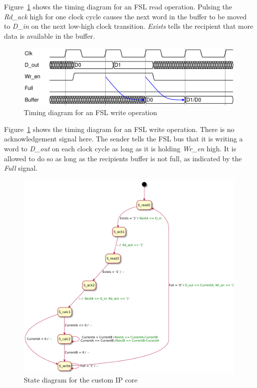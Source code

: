 \documentclass[11pt]{article}
\begin{document}
Figure~\ref{fig:fsl-write} shows the timing diagram for an FSL read operation. Pulsing the \emph{Rd\_ack} high for one clock cycle causes the next word in the buffer to be moved to \emph{D\_in} on the next low-high clock transition. \emph{Exists} tells the recipient that more data is available in the buffer.

\begin{figure}
   \centering
   \includegraphics[width=1\textwidth]{timingdiagrams/write.pdf}
   \caption{Timing diagram for an FSL write operation}
   \label{fig:fsl-write}
\end{figure}

Figure~\ref{fig:fsl-write} shows the timing diagram for an FSL write operation. There is no acknowledgement signal here. The sender tells the FSL bus that it is writing a word to \emph{D\_out} on each clock cycle as long as it is holding \emph{Wr\_en} high. It is allowed to do so as long as the recipients buffer is not full, as indicated by the \emph{Full} signal.

\begin{figure}
  \centering
  \includegraphics[width=1\textwidth]{statediagrams/hwstatediagram.pdf}
  \caption{State diagram for the custom IP core}
  \label{fig:state}
\end{figure}
\end{document}
